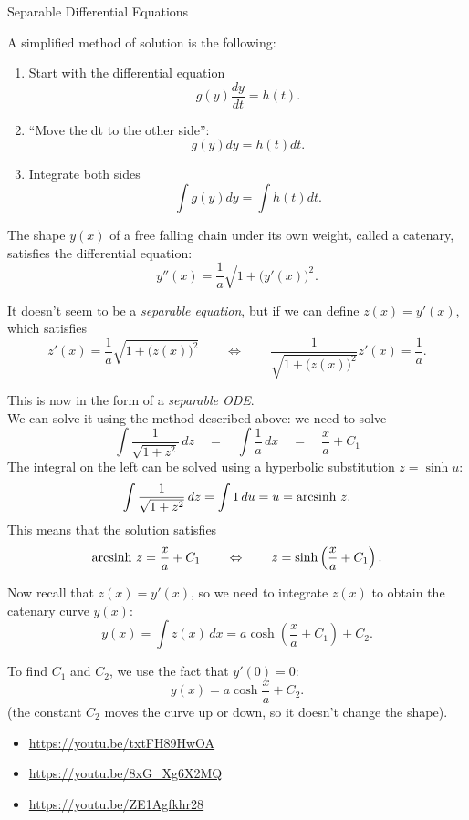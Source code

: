 \begin{submodule}{Separable Differential Equations}
\begin{graybox}
A simplified method of solution is the following:
\begin{enumerate}
	\item Start with the differential equation
	$$ g(y) \frac{dy}{dt} = h(t) .$$
	\item ``Move the dt to the other side'':
	$$ g(y) dy = h(t) dt .$$
	\item Integrate both sides
	$$ \int g(y) dy = \int h(t) dt.$$
\end{enumerate}	
\end{graybox}



\def\arcsinh{{\rm arcsinh\ }}
\begin{example}
The shape $y(x)$ of a free falling chain under its own weight, called a catenary, satisfies the differential equation:
$$
y''(x) = \frac1a \sqrt{1+\big(y'(x)\big)^2}.
$$

It doesn't seem to be a \emph{separable equation}, but if we can define $z(x) = y'(x)$, which satisfies
$$
z'(x) = \frac1a \sqrt{1+\big(z(x)\big)^2}
\qquad \Leftrightarrow \qquad \frac{1}{\sqrt{1+\big(z(x)\big)^2}} z'(x) = \frac1a.
$$

This is now in the form of a \emph{separable ODE}. \\

We can solve it using the method described above: we need to solve
$$
\int \frac{1}{\sqrt{1+z^2}}\,dz \quad = \quad \int \frac1a \,dx \quad = \quad \frac{x}{a} + C_1
$$
The integral on the left can be solved using a hyperbolic substitution $z = \sinh u$:
$$
\int \frac{1}{\sqrt{1+z^2}}\,dz = \int 1 \, du = u = \arcsinh z.
$$
This means that the solution satisfies
$$
\arcsinh z = \frac{x}{a} + C_1 
\qquad \Leftrightarrow \qquad z = \sinh \left(\frac{x}{a} + C_1 \right).
$$

Now recall that $z(x) = y'(x)$, so we need to integrate $z(x)$ to obtain the catenary curve $y(x)$:
$$
y(x) = \int z(x) \, dx = a \cosh \left(\frac{x}{a} + C_1\right) + C_2.
$$

To find $C_1$ and $C_2$, we use the fact that $y'(0)=0$:
$$
y(x) = a \cosh \frac{x}{a}  + C_2.
$$
(the constant $C_2$ moves the curve up or down, so it doesn't change the shape).
\end{example}


\begin{video}
\begin{itemize}
	\item \href{https://youtu.be/txtFH89HwOA}{https://youtu.be/txtFH89HwOA} \hfill {}
	\item \href{https://youtu.be/8xG_Xg6X2MQ}{https://youtu.be/8xG\_Xg6X2MQ} \hfill {}
	\item \href{https://youtu.be/ZE1Agfkhr28}{https://youtu.be/ZE1Agfkhr28} \hfill {}
\end{itemize}	
\end{video}

\end{submodule}

